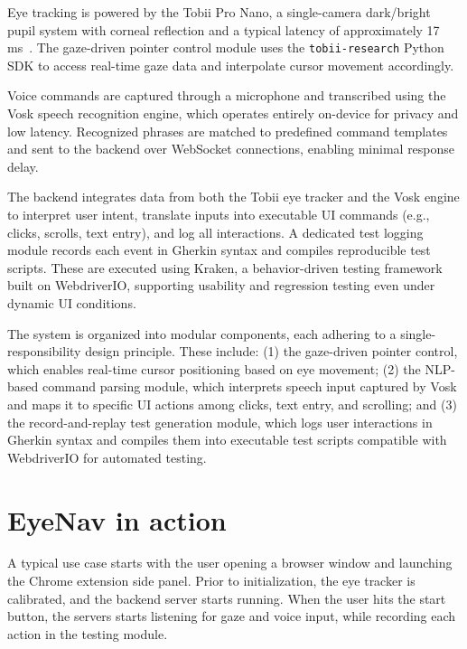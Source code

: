Eye tracking is powered by the Tobii Pro Nano, a single-camera dark/bright pupil system with corneal reflection and a typical latency of approximately 17 ms~\cite{tobiiabndpronano}. The gaze-driven pointer control module uses the \verb|tobii-research| Python SDK to access real-time gaze data and interpolate cursor movement accordingly.

Voice commands are captured through a microphone and transcribed using the Vosk speech recognition engine, which operates entirely on-device for privacy and low latency. Recognized phrases are matched to predefined command templates and sent to the backend over WebSocket connections, enabling minimal response delay.

The backend integrates data from both the Tobii eye tracker and the Vosk engine to interpret user intent, translate inputs into executable UI commands (e.g., clicks, scrolls, text entry), and log all interactions. A dedicated test logging module records each event in Gherkin syntax and compiles reproducible test scripts. These are executed using Kraken, a behavior-driven testing framework built on WebdriverIO, supporting usability and regression testing even under dynamic UI conditions.

The system is organized into modular components, each adhering to a single-responsibility design principle. These include: (1) the gaze-driven pointer control, which enables real-time cursor positioning based on eye movement; (2) the NLP-based command parsing module, which interprets speech input captured by Vosk and maps it to specific UI actions among clicks, text entry, and scrolling; and (3) the record-and-replay test generation module, which logs user interactions in Gherkin syntax and compiles them into executable test scripts compatible with WebdriverIO for automated testing.

\section{EyeNav in action}


A typical use case starts with the user opening a browser window and launching the Chrome extension side panel. Prior to initialization, the eye tracker is calibrated, and the backend server starts running. When the user hits the start button, the servers starts listening for gaze and voice input, while recording each action in the testing module.

